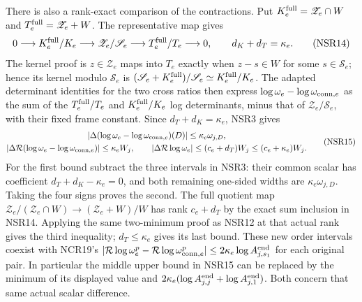 \documentclass[11pt,a4paper]{article}
\begin{document}
There is also a rank-exact comparison of the contractions.
Put $K_e^{\rm full}=\mathscr Z_e\cap W$ and
$T_e^{\rm full}=\mathscr Z_e+W$. The representative map gives
\[
 0\longrightarrow K_e^{\rm full}/K_e
 \longrightarrow\mathscr Z_e/\mathscr S_e
 \longrightarrow T_e^{\rm full}/T_e\longrightarrow0,
 \qquad d_K+d_T=\kappa_e .
 \tag{NSR14}
\]
The kernel proof is $z\in\mathscr Z_e$ maps into $T_e$
exactly when $z-s\in W$ for some $s\in\mathscr S_e$;
hence its kernel modulo $\mathscr S_e$ is
$(\mathscr S_e+K_e^{\rm full})/\mathscr S_e
\simeq K_e^{\rm full}/K_e$.
The adapted determinant identities for the two cross
ratios then express $\log\omega_e-\log\omega_{{\rm conn},e}$
as the sum of the $T_e^{\rm full}/T_e$ and
$K_e^{\rm full}/K_e$ log determinants, minus that of
$\mathscr Z_e/\mathscr S_e$, with their fixed frame constant.
Since $d_T+d_K=\kappa_e$, NSR3 gives
\[
 \begin{gathered}
 \left|\Delta(\log\omega_e-\log\omega_{{\rm conn},e})(D)\right|
                      \le\kappa_e\omega_{j,D},\\
 \left|\Delta\mathcal R(\log\omega_e-\log\omega_{{\rm conn},e})\right|
                      \le\kappa_eW_j,\qquad
 \left|\Delta\mathcal R\log\omega_e\right|
                      \le(c_e+d_T)W_j\le(c_e+\kappa_e)W_j .
 \end{gathered}\tag{NSR15}
\]
For the first bound subtract the three intervals in
NSR3: their common scalar has coefficient
$d_T+d_K-\kappa_e=0$, and both remaining one-sided
widths are $\kappa_e\omega_{j,D}$. Taking the four
signs proves the second. The full quotient map
$\mathscr Z_e/(\mathscr Z_e\cap W)\to(\mathscr Z_e+W)/W$
has rank $c_e+d_T$ by the exact sum inclusion in NSR14.
Applying the same two-minimum proof as NSR12 at that
actual rank gives the third inequality; $d_T\le\kappa_e$
gives its last bound. These new order intervals coexist with NCR19's
$|\mathcal R\log\omega_e^p-
\mathcal R\log\omega_{{\rm conn},e}^p|
\le2\kappa_e\log A_{j,s_1}^{\rm end}$ for each original
pair. In particular the middle upper bound in NSR15
can be replaced by the minimum of its displayed value
and $2\kappa_e(\log A_{j,j}^{\rm end}+\log A_{j,1}^{\rm end})$.
Both concern that same actual scalar difference.
\end{document}
